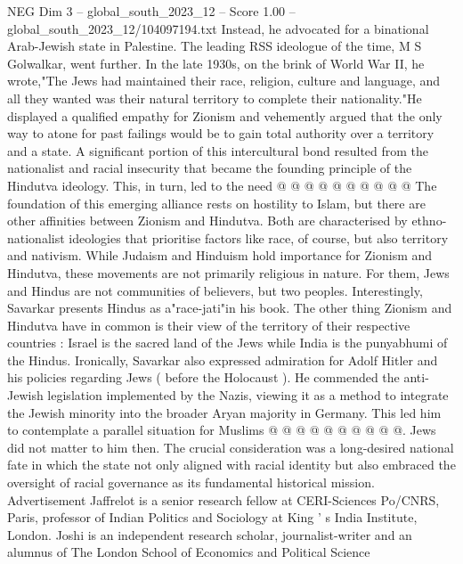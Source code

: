 \begin{textsample}{NEG Dim 3 – global\_south\_2023\_12 – Score 1.00 – global\_south\_2023\_12/104097194.txt}
Instead, he advocated for a binational Arab-Jewish state in Palestine.
The leading RSS ideologue of the time, M S Golwalkar, went further.
In the late 1930s, on the brink of World War II, he wrote,"The Jews had maintained their race, religion, culture and language, and all they wanted was their natural territory to complete their nationality."He displayed a qualified empathy for Zionism and vehemently argued that the only way to atone for past failings would be to gain total authority over a territory and a state.
A significant portion of this intercultural bond resulted from the nationalist and racial insecurity that became the founding principle of the Hindutva ideology.
This, in turn, led to the need @ @ @ @ @ @ @ @ @ @ The foundation of this emerging alliance rests on hostility to Islam, but there are other affinities between Zionism and Hindutva.
Both are characterised by ethno-nationalist ideologies that prioritise factors like race, of course, but also territory and nativism.
While Judaism and Hinduism hold importance for Zionism and Hindutva, these movements are not primarily religious in nature.
For them, Jews and Hindus are not communities of believers, but two peoples.
Interestingly, Savarkar presents Hindus as a"race-jati"in his book.
The other thing Zionism and Hindutva have in common is their view of the territory of their respective countries : Israel is the sacred land of the Jews while India is the punyabhumi of the Hindus.
Ironically, Savarkar also expressed admiration for Adolf Hitler and his policies regarding Jews ( before the Holocaust ).
He commended the anti-Jewish legislation implemented by the Nazis, viewing it as a method to integrate the Jewish minority into the broader Aryan majority in Germany.
This led him to contemplate a parallel situation for Muslims @ @ @ @ @ @ @ @ @ @.
Jews did not matter to him then.
The crucial consideration was a long-desired national fate in which the state not only aligned with racial identity but also embraced the oversight of racial governance as its fundamental historical mission.
Advertisement Jaffrelot is a senior research fellow at CERI-Sciences Po/CNRS, Paris, professor of Indian Politics and Sociology at King ' s India Institute, London.
Joshi is an independent research scholar, journalist-writer and an alumnus of The London School of Economics and Political Science

\end{textsample}
